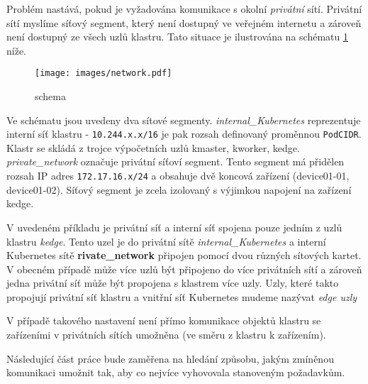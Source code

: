 Problém nastává, pokud je vyžadována komunikace s okolní \textit{privátní} sítí. Privátní sítí myslíme síťový segment, který není dostupný ve veřejném internetu a zároveň není dostupný ze všech uzlů klastru. Tato situace je ilustrována na schématu \ref{fig:schema} níže.

\begin{figure}[!ht]
    \centering
    \texttt{[image: images/network.pdf]}
    \caption{schema}
    \label{fig:schema}
\end{figure}

Ve schématu jsou uvedeny dva sítové segmenty. \textit{internal\_Kubernetes} reprezentuje interní síť klastru - \verb|10.244.x.x/16| je pak rozsah definovaný proměnnou \verb|PodCIDR|. Klastr se skládá z trojce výpočetních uzlů kmaster, kworker, kedge. \textit{private\_network} označuje privátní síťoví segment. Tento segment má přidělen rozsah IP adres \verb|172.17.16.x/24| a obsahuje dvě koncová zařízení (device01-01, device01-02). Síťový segment je zcela izolovaný s výjimkou napojení na zařízení kedge.

V uvedeném příkladu je privátní síť a interní síť spojena pouze jedním z uzlů klastru \textit{kedge}. Tento uzel je do privátní sítě \textit{internal\_Kubernetes} a interní Kubernetes sítě \textbf{rivate\_network} připojen pomocí dvou různých sítových kartet. V obecném případě může více uzlů být připojeno do více privátních sítí a zároveň jedna privátní síť může být propojena s klastrem více uzly. Uzly, které takto propojují privátní síť klastru a vnitřní síť Kubernetes mudeme nazývat \textit{edge uzly}

V případě takového nastavení není přímo komunikace objektů klastru se zařízeními v privátních sítích umožněna (ve směru z klastru k zařízením).

Následující část práce bude zaměřena na hledání způsobu, jakým zmíněnou komunikaci umožnit tak, aby co nejvíce vyhovovala stanoveným požadavkům.

